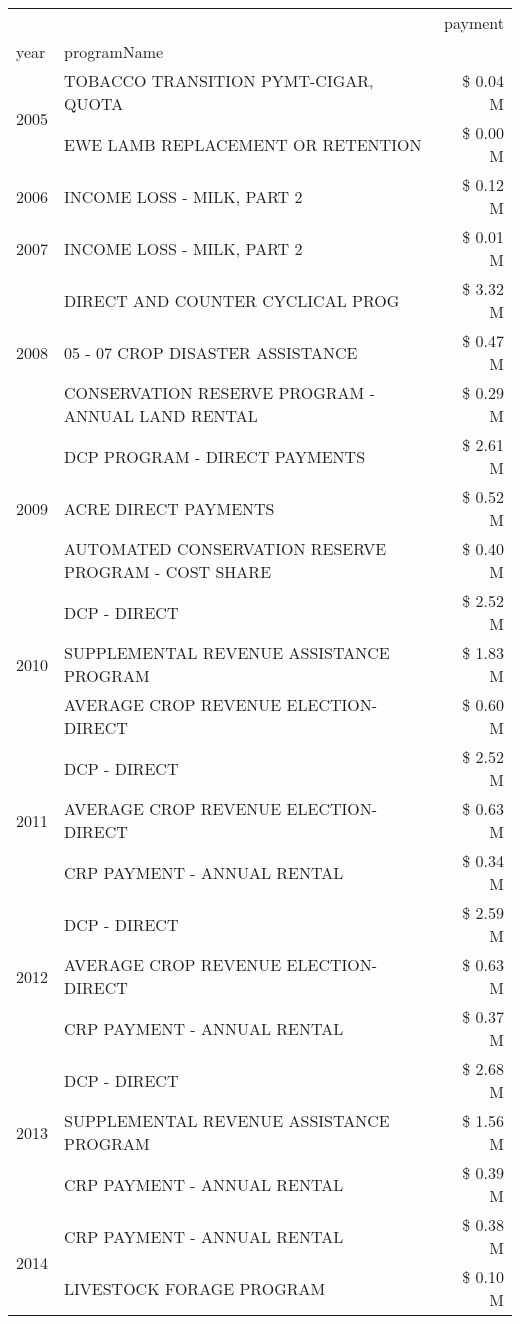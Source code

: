 \begin{tabular}{llr}
\toprule
 &  & payment \\
year & programName &  \\
\midrule
\multirow[t]{2}{*}{2005} & TOBACCO TRANSITION PYMT-CIGAR, QUOTA & \$ 0.04 M \\
 & EWE LAMB REPLACEMENT OR RETENTION & \$ 0.00 M \\
\cline{1-3}
2006 & INCOME LOSS - MILK, PART 2 & \$ 0.12 M \\
\cline{1-3}
2007 & INCOME LOSS - MILK, PART 2 & \$ 0.01 M \\
\cline{1-3}
\multirow[t]{3}{*}{2008} & DIRECT AND COUNTER CYCLICAL PROG & \$ 3.32 M \\
 & 05 - 07 CROP DISASTER ASSISTANCE & \$ 0.47 M \\
 & CONSERVATION RESERVE PROGRAM - ANNUAL LAND RENTAL & \$ 0.29 M \\
\cline{1-3}
\multirow[t]{3}{*}{2009} & DCP PROGRAM - DIRECT PAYMENTS & \$ 2.61 M \\
 & ACRE DIRECT PAYMENTS & \$ 0.52 M \\
 & AUTOMATED CONSERVATION RESERVE PROGRAM - COST SHARE & \$ 0.40 M \\
\cline{1-3}
\multirow[t]{3}{*}{2010} & DCP - DIRECT & \$ 2.52 M \\
 & SUPPLEMENTAL REVENUE ASSISTANCE PROGRAM & \$ 1.83 M \\
 & AVERAGE CROP REVENUE ELECTION-DIRECT & \$ 0.60 M \\
\cline{1-3}
\multirow[t]{3}{*}{2011} & DCP - DIRECT & \$ 2.52 M \\
 & AVERAGE CROP REVENUE ELECTION-DIRECT & \$ 0.63 M \\
 & CRP PAYMENT - ANNUAL RENTAL & \$ 0.34 M \\
\cline{1-3}
\multirow[t]{3}{*}{2012} & DCP - DIRECT & \$ 2.59 M \\
 & AVERAGE CROP REVENUE ELECTION-DIRECT & \$ 0.63 M \\
 & CRP PAYMENT - ANNUAL RENTAL & \$ 0.37 M \\
\cline{1-3}
\multirow[t]{3}{*}{2013} & DCP - DIRECT & \$ 2.68 M \\
 & SUPPLEMENTAL REVENUE ASSISTANCE PROGRAM & \$ 1.56 M \\
 & CRP PAYMENT - ANNUAL RENTAL & \$ 0.39 M \\
\cline{1-3}
\multirow[t]{3}{*}{2014} & CRP PAYMENT - ANNUAL RENTAL & \$ 0.38 M \\
 & LIVESTOCK FORAGE PROGRAM & \$ 0.10 M \\

\end{tabular}
